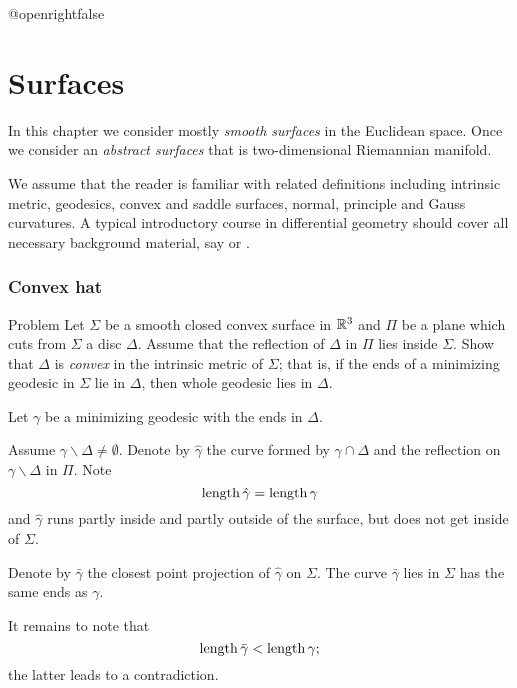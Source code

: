 \csname @openrightfalse\endcsname
\chapter{Surfaces}

In this chapter we consider mostly {}\emph{smooth surfaces} in the Euclidean space. 
Once we consider an {}\emph{abstract surfaces} that is  two-dimensional Riemannian manifold.

We assume that the reader is familiar with related definitions
including intrinsic metric, 
geodesics,
convex and saddle surfaces, 
normal, principle and 
Gauss curvatures.
A typical introductory course in differential geometry should cover all necessary background material, 
say \cite[][\S28--29]{hilbert-cohn-vossen}
or  
\cite{toponogov-curves-and-surfaces}.



\subsection*{Convex hat}

\begin{pr}{\easy}{Problem}\label{Convex hat}
Let $\Sigma$ be a smooth closed convex surface 
in $\mathbb{R}^3$ 
and $\Pi$ be a plane which cuts from $\Sigma$ a disc $\Delta$.
Assume that the reflection of $\Delta$ in $\Pi$ lies inside $\Sigma$.
Show that $\Delta$ is \emph{convex} in the intrinsic metric  of $\Sigma$;
that is, 
if the ends of a minimizing geodesic in $\Sigma$ 
lie in $\Delta$,
then whole geodesic lies in $\Delta$.
\end{pr}


Let $\gamma$ be a minimizing geodesic with the ends in $\Delta$.

Assume $\gamma\backslash\Delta\ne\emptyset$.
Denote by $\hat\gamma$ the curve formed by $\gamma\cap \Delta$ 
and the reflection on $\gamma\backslash\Delta$ in $\Pi$.
Note 
\[\operatorname{\rm length}\hat\gamma=\operatorname{\rm length}\gamma\]
and $\hat\gamma$ runs partly inside and partly outside of the surface, but does not get inside of $\Sigma$.

Denote by $\bar\gamma$ the closest point projection of $\hat\gamma$ on $\Sigma$.
The curve $\bar\gamma$ lies in $\Sigma$ has the same ends as $\gamma$.

It remains to note that 
\[\operatorname{\rm length}\bar\gamma<\operatorname{\rm length}\gamma;\]
the latter leads to a contradiction.\qeds

